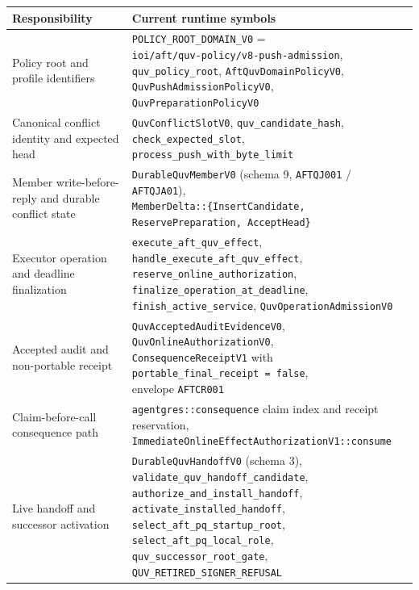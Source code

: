 \documentclass[11pt]{article}
\newcommand{\code}[1]{\texttt{#1}}
\begin{document}
\begin{center}
\scriptsize
\begin{tabularx}{\textwidth}{>{\raggedright\arraybackslash}p{} X}
\toprule
\textbf{Responsibility} & \textbf{Current runtime symbols} \\
\midrule
Policy root and profile identifiers & \shortstack[l]{\code{POLICY\_ROOT\_DOMAIN\_V0} =\\\code{ioi/aft/quv-policy/v8-push-admission},\\\code{quv\_policy\_root}, \code{AftQuvDomainPolicyV0},\\\code{QuvPushAdmissionPolicyV0},\\\code{QuvPreparationPolicyV0}} \\
Canonical conflict identity and expected head & \shortstack[l]{\code{QuvConflictSlotV0}, \code{quv\_candidate\_hash},\\\code{check\_expected\_slot}, \code{process\_push\_with\_byte\_limit}} \\
Member write-before-reply and durable conflict state & \shortstack[l]{\code{DurableQuvMemberV0} (schema 9, \code{AFTQJ001} / \code{AFTQJA01}),\\\code{MemberDelta::\{InsertCandidate, ReservePreparation, AcceptHead\}}} \\
Executor operation and deadline finalization & \shortstack[l]{\code{execute\_aft\_quv\_effect}, \code{handle\_execute\_aft\_quv\_effect},\\\code{reserve\_online\_authorization}, \code{finalize\_operation\_at\_deadline},\\\code{finish\_active\_service}, \code{QuvOperationAdmissionV0}} \\
Accepted audit and non-portable receipt & \shortstack[l]{\code{QuvAcceptedAuditEvidenceV0},\\\code{QuvOnlineAuthorizationV0},\\\code{ConsequenceReceiptV1} with\\\code{portable\_final\_receipt = false},\\envelope \code{AFTCR001}} \\
Claim-before-call consequence path & \shortstack[l]{\code{agentgres::consequence} claim index and receipt reservation,\\\code{ImmediateOnlineEffectAuthorizationV1::consume}} \\
Live handoff and successor activation & \shortstack[l]{\code{DurableQuvHandoffV0} (schema 3), \code{validate\_quv\_handoff\_candidate},\\\code{authorize\_and\_install\_handoff}, \code{activate\_installed\_handoff},\\\code{select\_aft\_pq\_startup\_root}, \code{select\_aft\_pq\_local\_role},\\\code{quv\_successor\_root\_gate}, \code{QUV\_RETIRED\_SIGNER\_REFUSAL}} \\

\end{tabularx}
\end{center}
\end{document}

